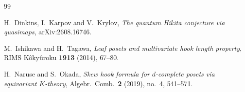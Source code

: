 \documentclass[reqno]{amsart}
\theoremstyle{plain}
\theoremstyle{definition}
\begin{document}
\begin{thebibliography}{99}

 H.~Dinkins, I.~Karpov and V.~Krylov, \emph{The quantum Hikita
conjecture via quasimaps}, arXiv:2608.16746.

 M.~Ishikawa and H.~Tagawa, \emph{Leaf posets and multivariate
hook length property}, RIMS K\^oky\^uroku \textbf{1913} (2014), 67--80.

 H.~Naruse and S.~Okada, \emph{Skew hook formula for $d$-complete
posets via equivariant $K$-theory}, Algebr.\ Comb.\ \textbf{2} (2019),
no.~4, 541--571.

\end{thebibliography}
\end{document}
